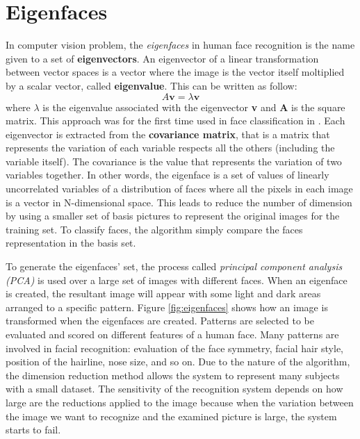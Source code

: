 \documentclass{report}
\begin{document}
\section{Eigenfaces}
\label{sec:eigen}
In computer vision problem, the \textit{eigenfaces} in human face recognition is the name given to a set of \textbf{eigenvectors}. An eigenvector of a linear transformation between vector spaces is a vector where the image is the vector itself moltiplied by a scalar vector, called \textbf{eigenvalue}. This can be written as follow:
\begin{equation}
  A\textbf{v} = \lambda \textbf{v}
\end{equation}
where $\lambda$ is the eigenvalue associated with the eigenvector \textbf{v} and \textbf{A} is the square matrix.
This approach was for the first time used in face classification in \cite{turk1991face}.
Each eigenvector is extracted from the \textbf{covariance matrix}, that is a matrix that represents the variation of each variable respects all the others (including the variable itself). The covariance is the value that represents the variation of two variables together.
In other words, the eigenface is a set of values of linearly uncorrelated variables of a distribution of faces where all the pixels in each image is a vector in N-dimensional space. This leads to reduce the number of dimension by using a smaller set of basis pictures to represent the original images for the training set. To classify faces, the algorithm simply compare the faces representation in the basis set.

To generate the eigenfaces' set, the process called \textit{principal component analysis (PCA)} is used over a large set of images with different faces. When an eigenface is created, the resultant image will appear with some light and dark areas arranged to a specific pattern. Figure \ref{fig:eigenfaces} shows how an image is transformed when the eigenfaces are created. Patterns are selected to be evaluated and scored on different features of a human face. Many patterns are involved in facial recognition: evaluation of the face symmetry, facial hair style, position of the hairline, nose size, and so on.
Due to the nature of the algorithm, the dimension reduction method allows the system to represent many subjects with a small dataset. The sensitivity of the recognition system depends on how large are the reductions applied to the image because when the variation between the image we want to recognize and the examined picture is large, the system starts to fail.
\end{document}
